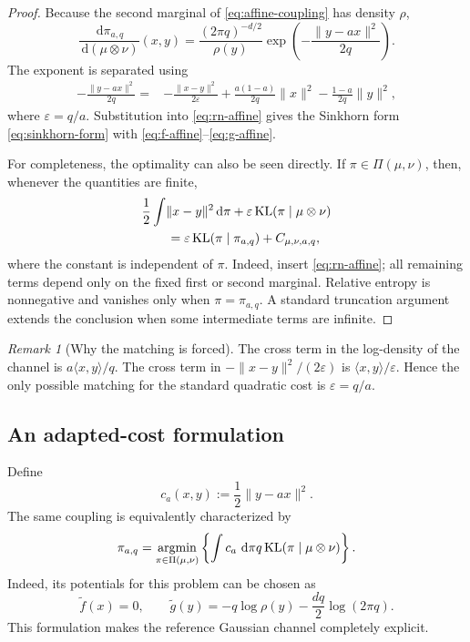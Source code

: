 \documentclass[11pt]{article}
\theoremstyle{remark}
\newtheorem{remark}[theorem]{Remark}
\newcommand{\KL}{\operatorname{KL}}
\newcommand{\PiC}{\Pi}
\newcommand{\dd}{\,\mathrm{d}}
\begin{document}
\begin{proof}
Because the second marginal of \eqref{eq:affine-coupling} has density $\rho$,
\begin{equation}
  \label{eq:rn-affine}
  \frac{\dd\pi_{a,q}}{\dd(\mu\otimes\nu)}(x,y)
  =\frac{(2\pi q)^{-d/2}}{\rho(y)}
    \exp\!\left(-\frac{\lVert y-ax\rVert^2}{2q}\right).
\end{equation}
The exponent is separated using
\begin{align}
  -\frac{\lVert y-ax\rVert^2}{2q}
  ={}&-\frac{\lVert x-y\rVert^2}{2\varepsilon}
     +\frac{a(1-a)}{2q}\lVert x\rVert^2
     -\frac{1-a}{2q}\lVert y\rVert^2,
  \label{eq:key-algebra}
\end{align}
where $\varepsilon=q/a$.  Substitution into \eqref{eq:rn-affine} gives
the Sinkhorn form \eqref{eq:sinkhorn-form} with
\eqref{eq:f-affine}--\eqref{eq:g-affine}.

For completeness, the optimality can also be seen directly.  If
$\pi\in\PiC(\mu,\nu)$, then, whenever the quantities are finite,
\begin{align}
 &\frac12\int\lVert x-y\rVert^2\dd\pi
  +\varepsilon\KL(\pi\mid\mu\otimes\nu) \notag\\
 &\qquad=\varepsilon\KL(\pi\mid\pi_{a,q})+C_{\mu,\nu,a,q},
  \label{eq:pythagorean}
\end{align}
where the constant is independent of $\pi$.  Indeed, insert
\eqref{eq:rn-affine}; all remaining terms depend only on the fixed first or
second marginal.  Relative entropy is nonnegative and vanishes only when
$\pi=\pi_{a,q}$.  A standard truncation argument extends the conclusion when
some intermediate terms are infinite.
\end{proof}

\begin{remark}[Why the matching is forced]
The cross term in the log-density of the channel is $a\langle x,y\rangle/q$.
The cross term in $-\lVert x-y\rVert^2/(2\varepsilon)$ is
$\langle x,y\rangle/\varepsilon$.  Hence the only possible matching for the
standard quadratic cost is $\varepsilon=q/a$.
\end{remark}

\subsection{An adapted-cost formulation}

Define
\begin{equation}
  \label{eq:adapted-cost-general}
  c_a(x,y):=\frac12\lVert y-ax\rVert^2.
\end{equation}
The same coupling is equivalently characterized by
\begin{equation}
  \label{eq:adapted-eot-general}
  \pi_{a,q}=\mathop{\rm argmin}_{\pi\in\PiC(\mu,\nu)}
  \left\{\int c_a\,\dd\pi
  q\KL(\pi\mid\mu\otimes\nu)\right\}.
\end{equation}
Indeed, its potentials for this problem can be chosen as
\begin{equation}
  \label{eq:adapted-potentials}
  \widetilde f(x)=0,
  \qquad
  \widetilde g(y)=-q\log\rho(y)-\frac{dq}{2}\log(2\pi q).
\end{equation}
This formulation makes the reference Gaussian channel completely explicit.
\end{document}
